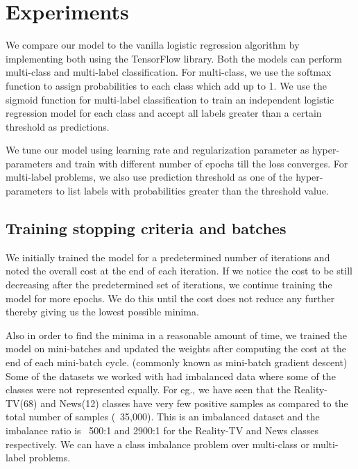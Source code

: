 \newpage
\chapter{Experiments}


We compare our model to the vanilla logistic regression algorithm by implementing both using the TensorFlow library. Both the models can perform multi-class and multi-label classification. For multi-class, we use the softmax function to assign probabilities to each class which add up to 1. We use the sigmoid function for multi-label classification to train an independent logistic regression model for each class and accept all labels greater than a certain threshold as predictions.

We tune our model using learning rate and regularization parameter as hyper-parameters and train with different number of epochs till the loss converges. For multi-label problems, we also use prediction threshold as one of the hyper-parameters to list labels with probabilities greater than the threshold value.

\section{Training stopping criteria and batches}

We initially trained the model for a predetermined number of iterations and noted the overall cost at the end of each iteration. If we notice the cost to be still decreasing after the predetermined set of iterations, we continue training the model for more epochs. We do this until the cost does not reduce any further thereby giving us the lowest possible minima.

Also in order to find the minima in a reasonable amount of time, we trained the model on mini-batches and updated the weights after computing the cost at the end of each mini-batch cycle. (commonly known as mini-batch gradient descent)
Some of the datasets we worked with had imbalanced data where some of the classes were not represented equally. For eg., we have seen that the Reality-TV(68) and News(12) classes have very few positive samples as compared to the total number of samples (~35,000). This is an imbalanced dataset and the imbalance ratio is ~500:1 and 2900:1 for the Reality-TV and News classes respectively. We can have a class imbalance problem over multi-class or multi-label problems.

